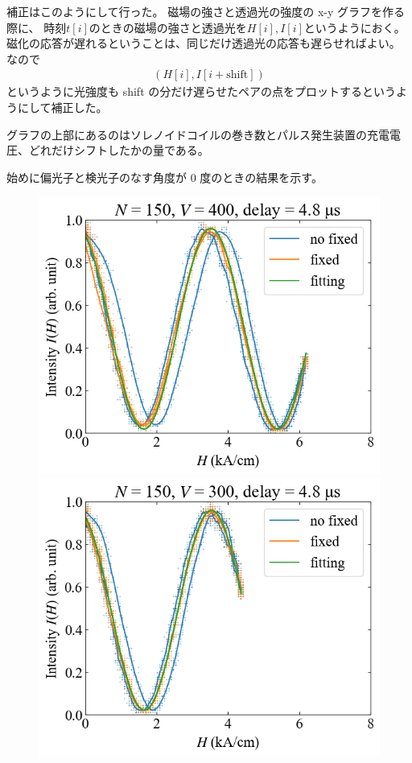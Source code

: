 \documentclass[9pt,dvipdfmx,a4paper]{jsarticle}
\begin{document}
補正はこのようにして行った。
磁場の強さと透過光の強度の x-y グラフを作る際に、
時刻\(t[i]\)のときの磁場の強さと透過光を\(H[i], I[i]\)というようにおく。
磁化の応答が遅れるということは、同じだけ透過光の応答も遅らせればよい。
なので
\begin{align}
    (H[i], I[i+\text{shift}])
\end{align}
というように光強度も shift の分だけ遅らせたペアの点をプロットするというようにして補正した。

グラフの上部にあるのはソレノイドコイルの巻き数とパルス発生装置の充電電圧、どれだけシフトしたかの量である。

始めに偏光子と検光子のなす角度が 0 度のときの結果を示す。
\begin{figure}[H]
    \centering
    \begin{minipage}[t]{0.24\columnwidth}
        \centering
        \includegraphics[width = \columnwidth]{xy/01.png}
    \end{minipage}
    \hfill
    \begin{minipage}[t]{0.24\columnwidth}
        \centering
        \includegraphics[width = \columnwidth]{xy/02.png}

\end{minipage}
\end{figure}
\end{document}
